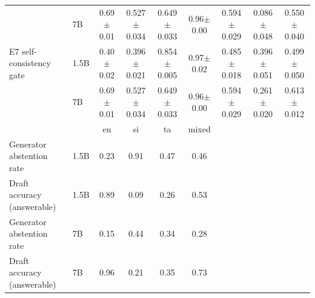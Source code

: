 \begin{table}[t]
\begin{tabular}{llccccccc}
     & 7B & 0.69{\scriptsize$\pm$0.01} & 0.527{\scriptsize$\pm$0.034} & 0.649{\scriptsize$\pm$0.033} & 0.96{\scriptsize$\pm$0.00} & 0.594{\scriptsize$\pm$0.029} & 0.086{\scriptsize$\pm$0.048} & 0.550{\scriptsize$\pm$0.040} \\
    \addlinespace
    E7 self-consistency gate & 1.5B & 0.40{\scriptsize$\pm$0.02} & 0.396{\scriptsize$\pm$0.021} & 0.854{\scriptsize$\pm$0.005} & 0.97{\scriptsize$\pm$0.02} & 0.485{\scriptsize$\pm$0.018} & 0.396{\scriptsize$\pm$0.051} & 0.499{\scriptsize$\pm$0.050} \\
     & 7B & 0.69{\scriptsize$\pm$0.01} & 0.527{\scriptsize$\pm$0.034} & 0.649{\scriptsize$\pm$0.033} & 0.96{\scriptsize$\pm$0.00} & 0.594{\scriptsize$\pm$0.029} & 0.261{\scriptsize$\pm$0.020} & 0.613{\scriptsize$\pm$0.012} \\
    \addlinespace
    \midrule
     & & en & si & ta & mixed & & & \\
    \midrule
    Generator abstention rate & 1.5B & 0.23 & 0.91 & 0.47 & 0.46 & & & \\
    Draft accuracy (answerable) & 1.5B & 0.89 & 0.09 & 0.26 & 0.53 & & & \\
    Generator abstention rate & 7B & 0.15 & 0.44 & 0.34 & 0.28 & & & \\
    Draft accuracy (answerable) & 7B & 0.96 & 0.21 & 0.35 & 0.73 & & & \\
    \bottomrule
  \end{tabular}
\end{table}
